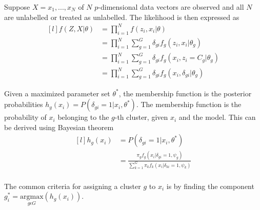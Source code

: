 Suppose \(X={x_1, ..., x_N}\) of \(N\) \(p\)-dimensional data vectors are observed and all \(N\) are unlabelled or treated as unlabelled. The likelihood is then expressed as 
\[\begin{matrix*}[l]
    f(Z,X | \theta) & =\prod_{i=1}^{N}f(z_i, x_i | \theta) \\ 
                    & =\prod_{i=1}^{N} \sum_{g=1}^{G} \delta_{gi}f_g(z_i,x_i|\theta_g)\\ 
                    & =\prod_{i=1}^{N} \sum_{g=1}^{G} \delta_{gi}f_g(x_i,z_i=C_g|\theta_g) \\ 
                    & =\prod_{i=1}^{N} \sum_{g=1}^{G}\delta_{gi}f_g(x_i,\delta_{gi}|\theta_g)
    \end{matrix*}\]

Given a maximized parameter set \(\theta^*\), the membership function is the posterior probabilities \(h_g(x_i)=P(\delta_{gi}=1|x_i,\theta^*)\). The membership function is the probability of \(x_i\) belonging to the \(g\)-th cluster, given \(x_i\) and the model. This can be derived using Bayesian theorem 
\[\begin{matrix*}[l]
    h_g(x_i)& = P(\delta_{gi}=1|x_i,\theta^*) \\ 
            & = \frac{\pi_gf_g(x_i|\delta_{gi}=1,\psi_g)}{\sum_{k=1}^{G}\pi_kf_k(x_i|\delta_{ki}=1,\psi_k)}\\ 
    \end{matrix*}\]

The common criteria for assigning a cluster \(g\) to \(x_i\) is by finding the component \(g_i^*=\underset{g\epsilon G}{\mathrm{argmax}}(h_{g}(x_i))\).


